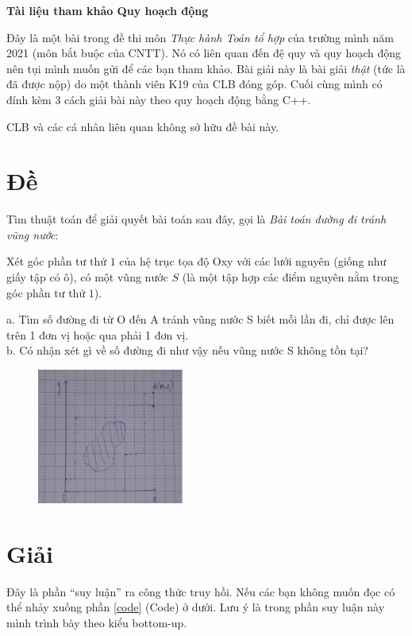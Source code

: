 \documentclass[12pt]{article}
\renewcommand{\a}[1]{\ensuremath{a_{#1}}}
\begin{document}
\begin{center}
    \textbf{\Large Tài liệu tham khảo Quy hoạch động}
\end{center}

Đây là một bài trong đề thi môn \textit{Thực hành Toán tổ hợp} của trường mình năm 2021 (môn bắt buộc của CNTT). Nó có liên quan đến đệ quy và quy hoạch động nên tụi mình muốn gửi để các bạn tham khảo. Bài giải này là bài giải \textit{thật} (tức là đã được nộp) do một thành viên K19 của CLB đóng góp. Cuối cùng mình có đính kèm 3 cách giải bài này theo quy hoạch động bằng C++. \bigskip 

CLB và các cá nhân liên quan không sở hữu đề bài này.

\tableofcontents

\section{Đề}

Tìm thuật toán để giải quyết bài toán sau đây, gọi là
\textit{Bài toán đường đi tránh vũng nước}: \bigskip

Xét góc phần tư thứ $1$ của hệ trục tọa độ Oxy với các lưới nguyên (giống như giấy tập có ô), có một vũng nước $S$ (là một tập hợp các điểm nguyên nằm trong góc phần tư thứ $1$). \bigskip

a. Tìm số đường đi từ O đến A tránh vũng nước S biết mỗi
lần đi, chỉ được lên trên 1 đơn vị hoặc qua phải 1 đơn vị.\\
b. Có nhận xét gì về số đường đi như vậy nếu vũng nước S
không tồn tại? \bigskip

\begin{figure}[H]
    \centering
    \includegraphics[width=0.43\textwidth]{image/qhd.png}
\end{figure}

\renewcommand{\a}[2]{\ensuremath{\a_{#1,\ #2}}}
\newcommand{\s}{\ensuremath{\mathcal S} }

\section{Giải}
Đây là phần ``suy luận'' ra công thức truy hồi. Nếu các bạn không muốn đọc có thể nhảy xuống phần \ref{code} (Code) ở dưới. Lưu ý là trong phần suy luận này mình trình bày theo kiểu bottom-up.
\end{document}

